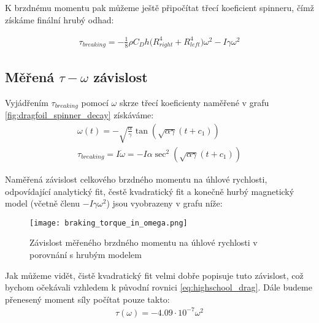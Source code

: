 K brzdnému momentu pak můžeme ještě připočítat třecí koeficient spinneru, čímž získáme finální hrubý odhad:

\begin{equation}
    \label{eq:breaking_torque_w_spinner_drag}
    \begin{gathered}
        \tau_{breaking} = -\frac{1}{8} \rho C_D h \big( R_{right}^4 + R_{left}^4 \big) \omega^2 -I\gamma\omega^2
    \end{gathered}
\end{equation}

\clearpage

\subsection{Měřená $\tau-\omega$ závislost}

Vyjádřením $\tau_{breaking}$ pomocí $\omega$ skrze třecí koeficienty naměřené v grafu \ref{fig:dragfoil_spinner_decay} získáváme:
\begin{equation}
    \label{eq:breaking_torque_from_coefs}
    \begin{gathered}
        \omega(t) = - \sqrt{\frac{\alpha}{\gamma}} \tan{(\sqrt{\alpha\gamma}(t+c_1))} \\
        \tau_{breaking} = I\dot{\omega} = -I\alpha \sec^2(\sqrt{\alpha \gamma} (t + c_1))
    \end{gathered}
\end{equation}

Naměřená závislost celkového brzdného momentu na úhlové rychlosti, odpovídající analytický fit, čestě kvadratický fit a konečně hurbý magnetický model (včetně členu $-I\gamma\omega^2$) jsou vyobrazeny v grafu níže:

\begin{figure}[H]
    \texttt{[image: braking\_torque\_in\_omega.png]}
    \centering
    \caption[Závislost brzdného momentu na úhlové rychlosti]{Závislost měřeného brzdného momentu na úhlové rychlosti v porovnání s hrubým modelem}
    \label{fig:braking_torque_in_omega}
\end{figure}

Jak můžeme vidět, čistě kvadratický fit velmi dobře popisuje tuto závislost, což bychom očekávali vzhledem k původní rovnici \ref{eq:highschool_drag}. Dále budeme přenesený moment síly počítat pouze takto: 
\begin{equation}
    \label{eq:torque_transf_final}
    \begin{gathered}
        \tau(\omega) = -4.09\cdot10^{-7}\omega^2
    \end{gathered}
\end{equation}

